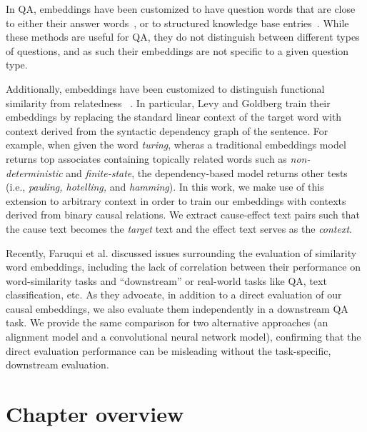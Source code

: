 In QA, embeddings have been customized to have question words that are close to either their answer words~\cite{bordes2014question}, or to structured knowledge base entries~\cite{yang2014joint}.  While these methods are useful for QA, they do not distinguish between different types of questions, and as such their embeddings are not specific to a given question type.

Additionally, embeddings have been customized to distinguish functional similarity from relatedness ~\cite{levy2014dependency,kielaspecializing}.
In particular, Levy and Goldberg train their embeddings by replacing the standard linear context of the target word with context derived from the syntactic dependency graph of the sentence.  For example, when given the word \emph{turing}, wheras a traditional embeddings model returns top associates containing topically related words such as \emph{non-deterministic} and \emph{finite-state}, the dependency-based model returns other tests (i.e., \emph{pauling, hotelling,} and \emph{hamming}).
In this work, we make use of this extension to arbitrary context in order to train our embeddings with contexts derived from binary causal relations.  We extract cause-effect text pairs such that the cause text becomes the \emph{target} text and the effect text serves as the \emph{context}. 

Recently, Faruqui et al.\citeyear{faruqui2016problems} discussed issues surrounding the evaluation of similarity word embeddings, including the lack of correlation between their performance on word-similarity tasks and ``downstream'' or real-world tasks like QA, text classification, etc.  As they advocate, in addition to a direct evaluation of our causal embeddings, we also evaluate them independently in a downstream QA task.  We provide the same comparison for two alternative approaches (an alignment model and a convolutional neural network model), confirming that the direct evaluation performance can be misleading without the task-specific, downstream evaluation.

\section{Chapter overview}

